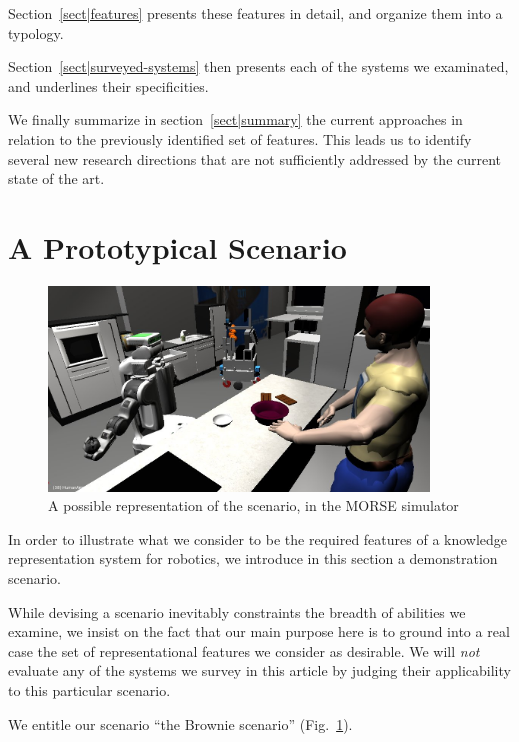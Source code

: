 \documentclass[a4paper, twocolumn]{article}
\begin{document}
Section~\ref{sect|features} presents these features in detail, and organize
them into a typology.

Section~\ref{sect|surveyed-systems} then presents each of the systems we
examinated, and underlines their specificities.

We finally summarize in section~\ref{sect|summary} the current approaches in
relation to the previously identified set of features. This leads us to
identify several new research directions that are not sufficiently addressed by
the current state of the art.

\section{A Prototypical Scenario}
\label{sect|scenario}

\begin{figure}
	\centering
	\includegraphics[width=0.9\textwidth]{figs/brownie_scenario.jpg}
	\caption{A possible representation of the scenario, in the MORSE simulator}
	\label{fig|scenario}
\end{figure}

In order to illustrate what we consider to be the required features of a
knowledge representation system for robotics, we introduce in this section a
demonstration scenario.

While devising a scenario inevitably constraints the breadth of abilities we
examine, we insist on the fact that our main purpose here is to ground into a
real case the set of representational features we consider as desirable.  We
will \emph{not} evaluate any of the systems we survey in this article by
judging their applicability to this particular scenario.

We entitle our scenario ``the Brownie scenario'' (Fig.~\ref{fig|scenario}).
\end{document}
